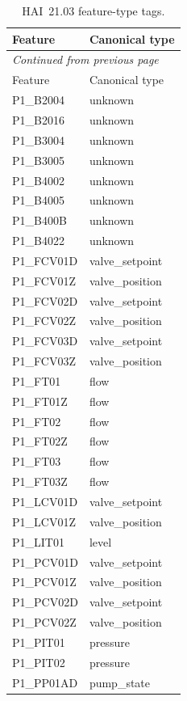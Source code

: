 \begin{longtable}{ll}
\caption{HAI~21.03 feature-type tags.}
\label{tab:hai-types}\\
\toprule
Feature & Canonical type \\
\midrule
\endfirsthead
\multicolumn{2}{l}{\textit{Continued from previous page}}\\
\toprule
Feature & Canonical type \\
\midrule
\endhead
\bottomrule
\endfoot
P1\_B2004      & unknown \\
P1\_B2016      & unknown \\
P1\_B3004      & unknown \\
P1\_B3005      & unknown \\
P1\_B4002      & unknown \\
P1\_B4005      & unknown \\
P1\_B400B      & unknown \\
P1\_B4022      & unknown \\
P1\_FCV01D     & valve\_setpoint \\
P1\_FCV01Z     & valve\_position \\
P1\_FCV02D     & valve\_setpoint \\
P1\_FCV02Z     & valve\_position \\
P1\_FCV03D     & valve\_setpoint \\
P1\_FCV03Z     & valve\_position \\
P1\_FT01       & flow \\
P1\_FT01Z      & flow \\
P1\_FT02       & flow \\
P1\_FT02Z      & flow \\
P1\_FT03       & flow \\
P1\_FT03Z      & flow \\
P1\_LCV01D     & valve\_setpoint \\
P1\_LCV01Z     & valve\_position \\
P1\_LIT01      & level \\
P1\_PCV01D     & valve\_setpoint \\
P1\_PCV01Z     & valve\_position \\
P1\_PCV02D     & valve\_setpoint \\
P1\_PCV02Z     & valve\_position \\
P1\_PIT01      & pressure \\
P1\_PIT02      & pressure \\
P1\_PP01AD     & pump\_state \\

\end{longtable}

